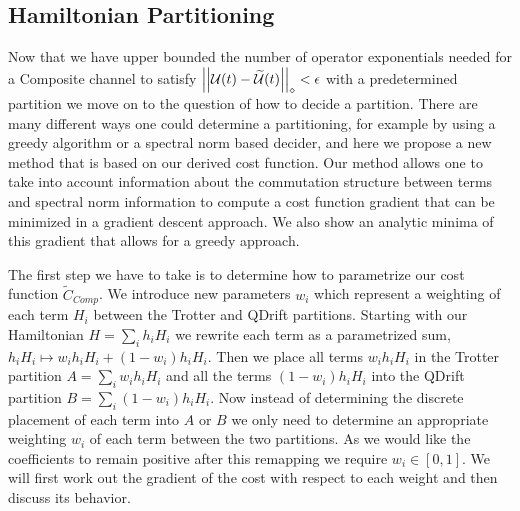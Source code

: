 \subsection{Hamiltonian Partitioning} \label{sec:first_order_partitioning}
Now that we have upper bounded the number of operator exponentials needed for a Composite channel to satisfy $\left| \left| \mathcal{U}(t) - \widetilde{\mathcal{U}}(t) \right| \right|_\diamond < \epsilon$ with a predetermined partition we move on to the question of how to decide a partition. There are many different ways one could determine a partitioning, for example by using a greedy algorithm or a spectral norm based decider, and here we propose a new method that is based on our derived cost function. Our method allows one to take into account information about the commutation structure between terms and spectral norm information to compute a cost function gradient that can be minimized in a gradient descent approach. We also show an analytic minima of this gradient that allows for a greedy approach. 

The first step we have to take is to determine how to parametrize our cost function $\widetilde{C}_{Comp}$. We introduce new parameters $w_i$ which represent a weighting of each term $H_i$ between the Trotter and QDrift partitions. Starting with our Hamiltonian $H = \sum_i h_i H_i$ we rewrite each term as a parametrized sum, $h_i H_i \mapsto w_i h_i H_i + (1-w_i) h_i H_i$. Then we place all terms $w_i h_i H_i$ in the Trotter partition $A = \sum_i w_i h_i H_i$ and all the terms $(1-w_i) h_i H_i$ into the QDrift partition $B = \sum_i (1-w_i) h_i H_i$. Now instead of determining the discrete placement of each term into $A$ or $B$ we only need to determine an appropriate weighting $w_i$ of each term between the two partitions. As we would like the coefficients to remain positive after this remapping we require $w_i \in [0, 1]$. We will first work out the gradient of the cost with respect to 
each weight and then discuss its behavior. 

